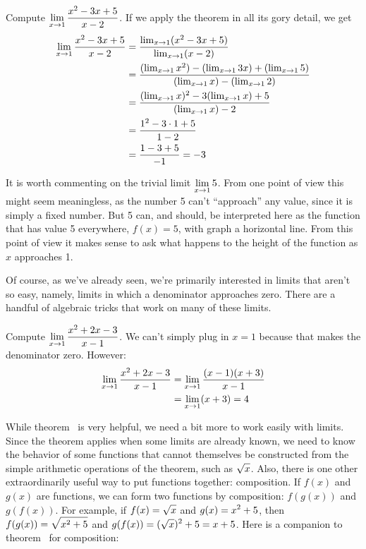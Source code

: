 \begin{example}
Compute $\displaystyle
\lim_{x\to 1}{x^2-3x+5\over x-2}$. If we apply the theorem
in all its gory detail, we get
\begin{align*}
\lim_{x\to 1}{x^2-3x+5\over x-2}&=
{\lim_{x\to 1}(x^2-3x+5)\over \lim_{x\to1}(x-2)} \\
&={(\lim_{x\to 1}x^2)-(\lim_{x\to1}3x)+(\lim_{x\to1}5)\over 
  (\lim_{x\to1}x)-(\lim_{x\to1}2)} \\
&={(\lim_{x\to 1}x)^2-3(\lim_{x\to1}x)+5\over (\lim_{x\to1}x)-2} \\
&={1^2-3\cdot1+5\over 1-2} \\
&={1-3+5\over -1} = -3 \\
\end{align*}
\end{example}

It is worth commenting on the trivial limit $\displaystyle \lim_{x\to1}5$. From one
point of view this might seem meaningless, as the number 5 can't
``approach'' any value, since it is simply a fixed number. But 5 can,
and should, be interpreted here as the function that has value 5
everywhere, $f(x)=5$, with graph a horizontal line. From this point of
view it makes sense to ask what happens to the height of the function
as $x$ approaches 1.

Of course, as we've already seen, we're primarily interested in limits
that aren't so easy, namely, limits in which a denominator approaches
zero. There are a handful of algebraic tricks that work on many of
these limits.

\begin{example}
Compute $\displaystyle\lim_{x\to1}{x^2+2x-3\over x-1}$. We can't
simply plug in $x=1$ because that makes the denominator zero. 
However:
\begin{align*}
\lim_{x\to1}{x^2+2x-3\over x-1}&=\lim_{x\to1}{(x-1)(x+3)\over x-1} \\
&=\lim_{x\to1}(x+3)=4 \\
\end{align*}
\vskip-10pt
\end{example}

While theorem~ is very helpful, we
need a bit more to work easily with limits. Since the theorem applies
when some limits are already known, we need to know the behavior of
some functions that cannot themselves be constructed from the simple
arithmetic operations of the theorem, such as $\displaystyle\sqrt{x}$. Also,
there is one other extraordinarily useful way to put functions
together: composition. If $f(x)$ and
$g(x)$ are functions, we can form two functions by composition:
$f(g(x))$ and $g(f(x))$. For example, if $\displaystyle f(x)=\sqrt{x}$ and $\displaystyle
\displaystyle g(x)=x^2+5$, then $\displaystyle f(g(x))=\sqrt{x^2+5}$ and $\displaystyle
g(f(x))=(\sqrt{x})^2+5=x+5$.  Here is a companion to
theorem~ for composition:

